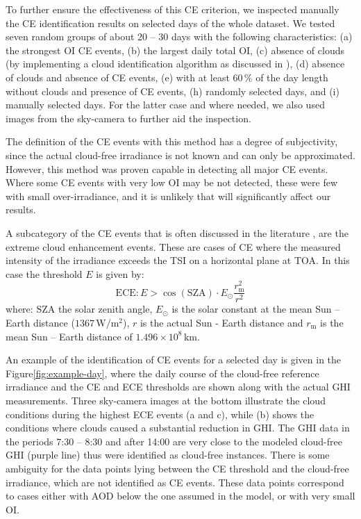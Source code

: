 \documentclass[preprint, 5p,
authoryear]{elsarticle} %
\begin{document}
To further ensure the effectiveness of this CE criterion, we inspected
manually the CE identification results on selected days of the whole
dataset. We tested seven random groups of about 20 -- 30 days with the
following characteristics: (a) the strongest OI CE events, (b) the
largest daily total OI, (c) absence of clouds (by implementing a cloud
identification algorithm as discussed in \citet{Natsis2023}), (d)
absence of clouds and absence of CE events, (e) with at least \(60\,\%\)
of the day length without clouds and presence of CE events, (h) randomly
selected days, and (i) manually selected days. For the latter case and
where needed, we also used images from the sky-camera to further aid the
inspection.

The definition of the CE events with this method has a degree of
subjectivity, since the actual cloud-free irradiance is not known and
can only be approximated. However, this method was proven capable in
detecting all major CE events. Where some CE events with very low OI may
be not detected, these were few with small over-irradiance, and it is
unlikely that will significantly affect our results.

A subcategory of the CE events that is often discussed in the literature
\citep{Cordero2023, Martins2022, Yordanov2015}, are the extreme cloud
enhancement events. These are cases of CE where the measured intensity
of the irradiance exceeds the TSI on a horizontal plane at TOA. In this
case the threshold \(E\) is given by: \begin{equation}
\text{ECE}: E > \cos(\text{SZA}) \cdot E_{\odot} \frac{r^2_\text{m}} {r^2}
\label{eq:ECE}
\end{equation} where: \(\text{SZA}\) the solar zenith angle,
\(E_{\odot}\) is the solar constant at the mean Sun -- Earth distance
(\(1367\,\text{W}/\text{m}^2\)), \(r\) is the actual Sun - Earth
distance and \(r_\text{m}\) is the mean Sun -- Earth distance of
\(1.496\times10^8\,\text{km}\).

An example of the identification of CE events for a selected day is
given in the Figure\nobreakspace{}\ref{fig:example-day}, where the daily
course of the cloud-free reference irradiance and the CE and ECE
thresholds are shown along with the actual GHI measurements. Three
sky-camera images at the bottom illustrate the cloud conditions during
the highest ECE events (a and c), while (b) shows the conditions where
clouds caused a substantial reduction in GHI. The GHI data in the
periods 7:30 -- 8:30 and after 14:00 are very close to the modeled
cloud-free GHI (purple line) thus were identified as cloud-free
instances. There is some ambiguity for the data points lying between the
CE threshold and the cloud-free irradiance, which are not identified as
CE events. These data points correspond to cases either with AOD below
the one assumed in the model, or with very small OI.
\end{document}
